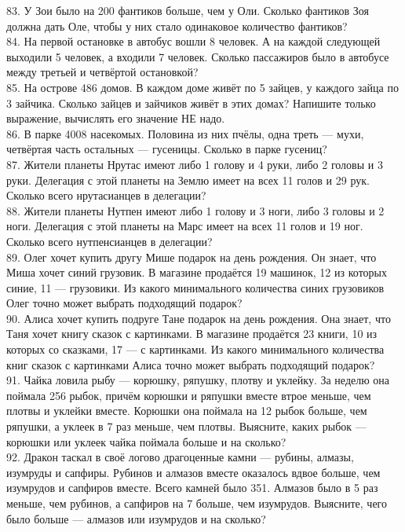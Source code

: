 83. У Зои было на 200 фантиков больше, чем у Оли. Сколько фантиков Зоя должна дать Оле, чтобы у них стало одинаковое количество фантиков?\\
84. На первой остановке в автобус вошли 8 человек. А на каждой следующей выходили 5 человек, а входили 7 человек. Сколько пассажиров было в  автобусе между третьей и четвёртой остановкой?\\
85. На острове 486 домов. В каждом доме живёт по 5 зайцев, у каждого зайца по 3 зайчика. Сколько зайцев и зайчиков живёт в этих домах? Напишите только выражение, вычислять его значение НЕ надо.\\
86. В парке 4008 насекомых. Половина из них пчёлы, одна треть --- мухи, четвёртая часть остальных ---  гусеницы. Сколько в парке гусениц?\\
87. Жители планеты Нрутас имеют либо 1 голову и 4 руки, либо 2 головы и 3 руки. Делегация с этой планеты на Землю имеет на всех 11 голов и 29 рук. Сколько всего нрутасианцев в делегации?\\
88. Жители планеты Нутпен имеют либо 1 голову и 3 ноги, либо 3 головы и 2 ноги. Делегация с этой планеты на Марс имеет на всех 11 голов и 19 ног. Сколько всего нутпенсианцев в делегации?\\
89. Олег хочет купить другу Мише подарок на день рождения. Он знает, что Миша хочет синий грузовик. В магазине продаётся 19 машинок, 12 из которых синие, 11 --- грузовики. Из какого минимального количества синих грузовиков Олег точно может выбрать подходящий подарок?\\
90. Алиса хочет купить подруге Тане подарок на день рождения. Она знает, что Таня хочет книгу сказок с картинками. В магазине продаётся 23 книги, 10 из которых со сказками, 17 --- с картинками. Из какого минимального количества книг сказок с картинками Алиса точно может выбрать подходящий подарок?\\
91. Чайка ловила рыбу --- корюшку, ряпушку, плотву и уклейку. За неделю она поймала 256 рыбок, причём корюшки и ряпушки вместе втрое меньше, чем плотвы и уклейки вместе. Корюшки она поймала на 12 рыбок больше, чем ряпушки, а уклеек в 7 раз меньше, чем плотвы. Выясните, каких рыбок --- корюшки или уклеек чайка поймала больше и на сколько?\\
92. Дракон таскал в своё логово драгоценные камни --- рубины, алмазы, изумруды и сапфиры. Рубинов и алмазов вместе оказалось вдвое больше, чем изумрудов и сапфиров вместе. Всего камней было 351. Алмазов было в 5 раз меньше, чем рубинов, а сапфиров на 7 больше, чем изумрудов. Выясните, чего было больше --- алмазов или изумрудов и на сколько?\\
